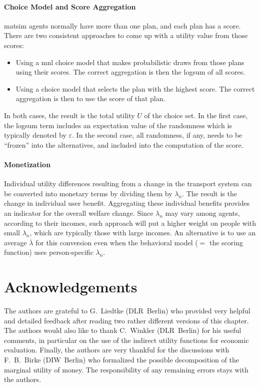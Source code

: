 \paragraph*{Choice Model and Score Aggregation}

\gls{matsim} agents normally have more than one plan, and each plan has a score.  There are two consistent approaches to come up with a utility value from those scores:
\begin{itemize}\styleItemize

\item Using a \gls{mnl} choice model that makes probabilistic draws from those plans using their scores. The correct aggregation is then the logsum of all scores.

\item Using a choice model that selects the plan with the highest score. The correct aggregation is then to use the score of that plan.

\end{itemize}
In both cases, the result is the total utility $U$ of the choice set.  In the first case, the logsum term includes an expectation value of the randomness which is typically denoted by $\varepsilon$.  In the second case, all randomness, if any, needs to be ``frozen'' into the alternatives, and included into the computation of the score.

\paragraph*{Monetization}

Individual utility differences resulting from a change in the transport system can be converted into monetary terms by dividing them by $\lambda_n$. The result is the change in individual user benefit. Aggregating these individual benefits provides an indicator for the overall welfare change.
%
Since $\lambda_n$ may vary among agents, \eg according to their incomes, such approach will put a higher weight on people with small $\lambda_n$, which are typically those with large incomes.  An alternative is to use an average $\overline\lambda$ for this conversion even when the behavioral model ($=$ the scoring function) uses person-specific $\lambda_n$.

\section*{Acknowledgements}
The authors are grateful to G.~Liedtke (DLR~Berlin) who provided very helpful and detailed feedback after reading two rather different versions of this chapter.
%
The authors would also like to thank C.~Winkler (DLR~Berlin) for his useful comments, in particular on the use of the indirect utility functions for economic evaluation.
%
Finally, the authors are very thankful for the discussions with F.~B.~Birke (DIW~Berlin) who formalized the possible decomposition of the marginal utility of money.
%
The responsibility of any remaining errors stays with the authors.


